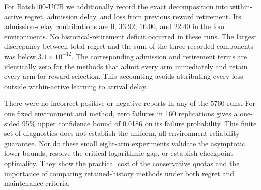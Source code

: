 For Batch100-UCB we additionally record the exact decomposition into
within-active regret, admission delay, and loss from previous reward
retirement. Its admission-delay contributions are $0$, $33.92$, $16.00$,
and $22.40$ in the four environments. No historical-retirement deficit
occurred in these runs. The largest discrepancy between total regret and
the sum of the three recorded components was below $3.1\times10^{-12}$.
The corresponding admission and retirement terms are identically zero for
the methods that admit every arm immediately and retain every arm for
reward selection. This accounting avoids attributing every loss outside
within-active learning to arrival delay.

There were no incorrect positive or negative reports in any of the 5760
runs. For one fixed environment and method, zero failures in 160
replications gives a one-sided 95\% upper confidence bound of 0.0186 on
its failure probability. This finite set of diagnostics does not establish
the uniform, all-environment reliability guarantee. Nor do these small
eight-arm experiments validate the asymptotic lower bounds, resolve the
critical logarithmic gap, or establish checkpoint optimality. They show
the practical cost of the conservative quotas and the importance of
comparing retained-history methods under both regret and maintenance
criteria.
